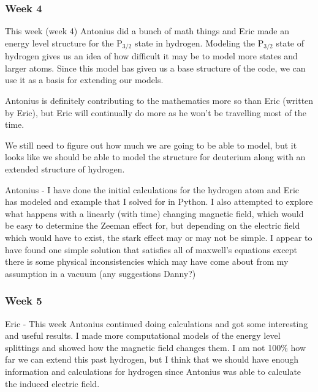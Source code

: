 \documentclass[11pt]{article}
\begin{document}
\subsubsection*{Week 4}

This week (week 4) Antonius did a bunch of math things and Eric made an energy level structure for the P$_{3/2}$ state in hydrogen.  Modeling the P$_{3/2}$ state of hydrogen gives us an idea of how difficult it may be to model more states and larger atoms.  Since this model has given us a base structure of the code, we can use it as a basis for extending our models.

Antonius is definitely contributing to the mathematics more so than Eric (written by Eric), but Eric will continually do more as he won't be travelling most of the time.

We still need to figure out how much we are going to be able to model, but it looks like we should be able to model the structure for deuterium along with an extended structure of hydrogen.

Antonius - I have done the initial calculations for the hydrogen atom and Eric has modeled and example that I solved for in Python. I also attempted to explore what happens with a linearly (with time) changing magnetic field, which would be easy to determine the Zeeman effect for, but depending on the electric field which would have to exist, the stark effect may or may not be simple. I appear to have found one simple solution that satisfies all of maxwell's equations except there is some physical inconsistencies which may have come about from my assumption in a vacuum (any suggestions Danny?)


\subsubsection*{Week 5}
Eric - This week Antonius continued doing calculations and got some interesting and useful results.  I made more computational models of the energy level splittings and showed how the magnetic field changes them.  I am not 100\% how far we can extend this past hydrogen, but I think that we should have enough information and calculations for hydrogen since Antonius was able to calculate the induced electric field.

\end{document}
